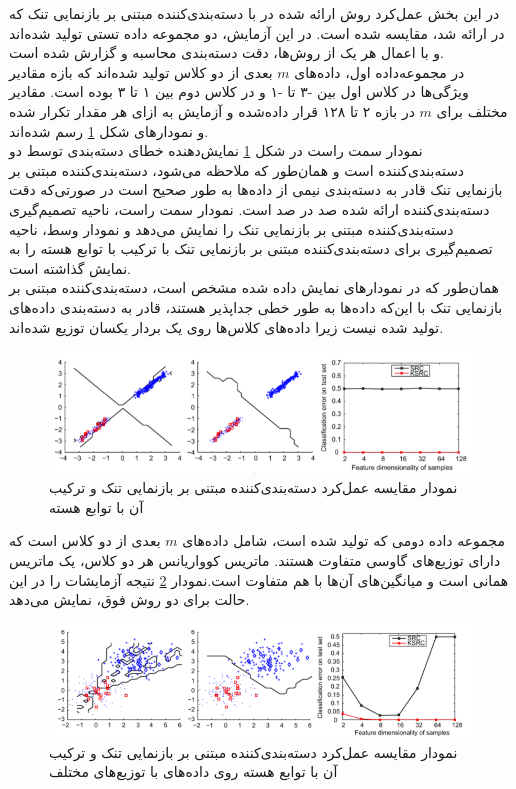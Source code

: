 \documentclass[12pt,twocolumn]{article}
\begin{document}
در این بخش عمل‌کرد روش ارائه شده در \cite{zhang2012kernel} با دسته‌بندی‌کننده مبتنی بر بازنمایی تنک که در \cite{wright2009robust} ارائه شد، مقایسه شده است. در این آزمایش،‌ دو مجموعه داده تستی تولید شده‌اند و با اعمال هر یک از روش‌ها، دقت دسته‌بندی محاسبه و گزارش شده است.
\\
در مجموعه‌داده اول، داده‌های $m$ بعدی از دو کلاس تولید شده‌اند که بازه مقادیر ویژگی‌ها در کلاس اول بین -۳ تا -۱ و در کلاس دوم بین ۱ تا ۳ بوده است. مقادیر مختلف برای $m$ در بازه ۲ تا ۱۲۸ قرار داده‌شده و آزمایش به ازای هر مقدار تکرار شده و نمودارهای شکل \ref{fig:2-2} رسم شده‌اند.
\\
نمودار سمت راست در شکل \ref{fig:2-2} نمایش‌دهنده خطای دسته‌بندی توسط دو دسته‌بندی‌کننده است و همان‌طور که ملاحظه می‌شود، دسته‌بندی‌کننده مبتنی بر بازنمایی تنک قادر به دسته‌بندی نیمی از داده‌ها به طور صحیح است در صورتی‌که دقت دسته‌بندی‌کننده ارائه شده صد در صد است. نمودار سمت راست، ناحیه تصمیم‌گیری دسته‌بندی‌کننده مبتنی بر بازنمایی تنک را نمایش می‌دهد و نمودار وسط، ناحیه تصمیم‌گیری برای دسته‌بندی‌کننده مبتنی بر بازنمایی تنک با ترکیب با توابع هسته را به نمایش گذاشته است. 
\\
همان‌طور که در نمودارهای نمایش داده شده مشخص است، دسته‌بندی‌کننده مبتنی بر بازنمایی تنک با این‌که داده‌ها به طور خطی جداپذیر هستند، قادر به دسته‌بندی داده‌های تولید شده نیست زیرا داده‌های کلاس‌ها روی یک بردار یکسان توزیع شده‌اند.

\begin{figure}[t]
\centering
\includegraphics[width=\textwidth]{Imgs/2-2.png}
\caption{نمودار مقایسه عمل‌کرد دسته‌بندی‌کننده مبتنی بر بازنمایی تنک و ترکیب آن با توابع هسته\cite{zhang2012kernel}}
\label{fig:2-2}
\end{figure}

مجموعه داده دومی که تولید شده است، شامل داده‌های $m$ بعدی از دو کلاس است که دارای توزیع‌های گاوسی متفاوت هستند. ماتریس کوواریانس هر دو کلاس، یک ماتریس همانی است و میانگین‌های آن‌ها با هم متفاوت است.نمودار \ref{fig:2-3} نتیجه آزمایشات را در این حالت برای دو روش فوق، نمایش می‌دهد.

\begin{figure}[t]
\centering
\includegraphics[width=\textwidth]{Imgs/2-3.png}
\caption{نمودار مقایسه عمل‌کرد دسته‌بندی‌کننده مبتنی بر بازنمایی تنک و ترکیب آن با توابع هسته روی داده‌های با توزیع‌های مختلف\cite{zhang2012kernel}}
\label{fig:2-3}
\end{figure}
\end{document}
